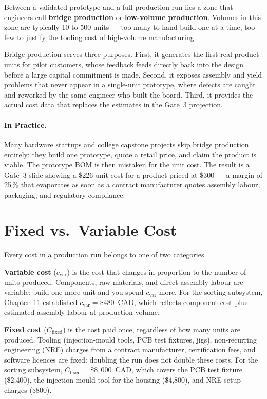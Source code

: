 Between a validated prototype and a full production run lies a zone that
engineers call \textbf{bridge production} or
\textbf{low-volume production}.
Volumes in this zone are typically 10 to 500 units --- too many to hand-build
one at a time, too few to justify the tooling cost of high-volume manufacturing.

Bridge production serves three purposes.
First, it generates the first real product units for pilot customers, whose
feedback feeds directly back into the design before a large capital commitment
is made.
Second, it exposes assembly and yield problems that never appear in a
single-unit prototype, where defects are caught and reworked by the same
engineer who built the board.
Third, it provides the actual cost data that replaces the estimates in the
Gate~3 projection.

\paragraph{In Practice.}
Many hardware startups and college capstone projects skip bridge production
entirely: they build one prototype, quote a retail price, and claim the product
is viable.
The prototype BOM is then mistaken for the unit cost.
The result is a Gate~3 slide showing a \$226 unit cost for a product priced at
\$300 --- a margin of 25\,\% that evaporates as soon as a contract manufacturer
quotes assembly labour, packaging, and regulatory compliance.

\section{Fixed vs.\ Variable Cost}
\label{sec:ch12-fixed-variable}

Every cost in a production run belongs to one of two categories.

\textbf{Variable cost} ($c_{\text{var}}$) is the cost that
changes in proportion to the number of units produced.
Components, raw materials, and direct assembly labour are variable: build one
more unit and you spend $c_{\text{var}}$ more.
For the sorting subsystem, Chapter~11 established $c_{\text{var}} = \$480$~CAD,
which reflects component cost plus estimated assembly labour at production
volume.

\textbf{Fixed cost} ($C_{\text{fixed}}$) is the cost paid
once, regardless of how many units are produced.
Tooling (injection-mould tools, PCB test fixtures, jigs), non-recurring
engineering (NRE) charges from a contract manufacturer, certification fees, and
software licences are fixed: doubling the run does not double these costs.
For the sorting subsystem, $C_{\text{fixed}} = \$8{,}000$~CAD, which covers the
PCB test fixture (\$2,400), the injection-mould tool for the housing
(\$4,800), and NRE setup charges (\$800).

